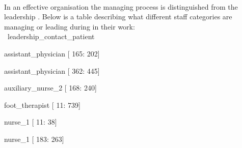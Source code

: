 \documentclass[12pt,a4paper,oneside]{article}
\let\oldcite\cite
\renewcommand*\cite[1]{\textsuperscript{\oldcite{#1}}}
\begin{document}
\ \\
In an effective organisation the managing process is distinguished from the leadership \cite{leader1}. Below is a table describing what different staff categories are managing or leading during in their work:
\\\ 
leadership\_contact\_patient \\
\begin{itemize}
{ \item assistant\_physician [ 165: 202] }%
{ \item assistant\_physician [ 362: 445] }%
{ \item auxiliary\_nurse\_2 [ 168: 240] }%
{ \item foot\_therapist [  11: 739] }%
{ \item nurse\_1 [  11:  38] }%
{ \item nurse\_1 [ 183: 263] }%

\end{itemize}
\end{document}
